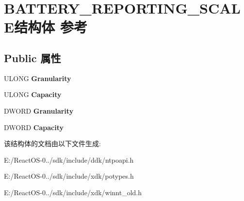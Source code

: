 \hypertarget{struct_b_a_t_t_e_r_y___r_e_p_o_r_t_i_n_g___s_c_a_l_e}{}\section{B\+A\+T\+T\+E\+R\+Y\+\_\+\+R\+E\+P\+O\+R\+T\+I\+N\+G\+\_\+\+S\+C\+A\+L\+E结构体 参考}
\label{struct_b_a_t_t_e_r_y___r_e_p_o_r_t_i_n_g___s_c_a_l_e}
\subsection*{Public 属性}
\begin{DoxyCompactItemize}
\item 
\mbox{\label{struct_b_a_t_t_e_r_y___r_e_p_o_r_t_i_n_g___s_c_a_l_e_aa712aec5f2124b46897ccc1fbb8afa0c}} 
U\+L\+O\+NG {\bfseries Granularity}
\item 
\mbox{\label{struct_b_a_t_t_e_r_y___r_e_p_o_r_t_i_n_g___s_c_a_l_e_a7c76103bd83fa927a163fbb040f95c9c}} 
U\+L\+O\+NG {\bfseries Capacity}
\item 
\mbox{\label{struct_b_a_t_t_e_r_y___r_e_p_o_r_t_i_n_g___s_c_a_l_e_a8132f9234eb507357a9c35c5b2aa40ec}} 
D\+W\+O\+RD {\bfseries Granularity}
\item 
\mbox{\label{struct_b_a_t_t_e_r_y___r_e_p_o_r_t_i_n_g___s_c_a_l_e_a56e2bb75d9bae327d5caeadb20a58988}} 
D\+W\+O\+RD {\bfseries Capacity}
\end{DoxyCompactItemize}


该结构体的文档由以下文件生成\+:\begin{DoxyCompactItemize}
\item 
E\+:/\+React\+O\+S-\/0../sdk/include/ddk/ntpoapi.\+h\item 
E\+:/\+React\+O\+S-\/0../sdk/include/xdk/potypes.\+h\item 
E\+:/\+React\+O\+S-\/0../sdk/include/xdk/winnt\+\_\+old.\+h\end{DoxyCompactItemize}
